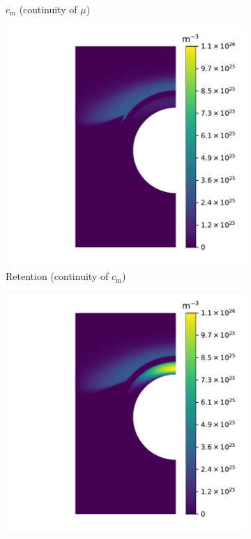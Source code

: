 \begin{figure}
\begin{subfigure}{0.5\linewidth}
        \caption{$c_\mathrm{m}$ (continuity of $\mu$)}
    \end{subfigure}
    \begin{subfigure}{0.5\linewidth}
        \centering
        \includegraphics[width=\linewidth]{Figures/Chapter3/monoblocks/interface_condition/iter case/retention_c.pdf}
        \caption{Retention (continuity of $c_\mathrm{m}$)}
    \end{subfigure}%
    \begin{subfigure}{0.5\linewidth}
        \centering
        \includegraphics[width=\linewidth]{Figures/Chapter3/monoblocks/interface_condition/iter case/retention_mu.pdf}

\end{subfigure}
\end{figure}
